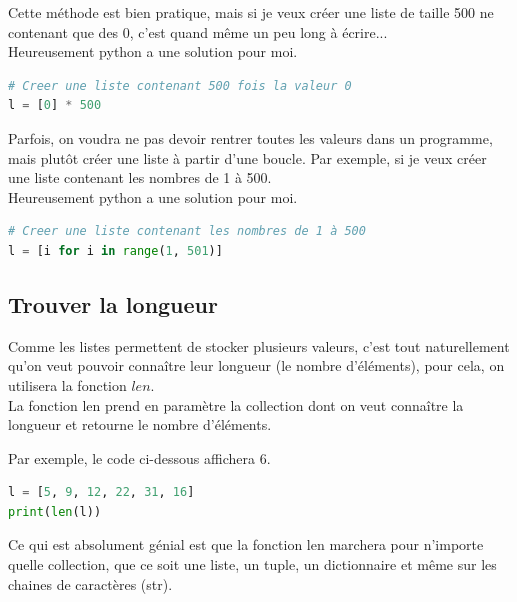 \begin{Astuce}
    Cette méthode est bien pratique, mais si je veux créer une liste de taille 500 ne contenant que des 0, c'est quand même un peu long à écrire...\\
    Heureusement python a une solution pour moi.
\begin{lstlisting}[style=pythonstyle, language=python]
# Creer une liste contenant 500 fois la valeur 0
l = [0] * 500
\end{lstlisting}
\end{Astuce}

\begin{Astuce}
    Parfois, on voudra ne pas devoir rentrer toutes les valeurs dans un programme, mais plutôt créer une liste à partir d'une boucle. Par exemple, si je veux créer une liste contenant les nombres de 1 à 500.\\
    Heureusement python a une solution pour moi.
\begin{lstlisting}[style=pythonstyle, language=python]
# Creer une liste contenant les nombres de 1 à 500
l = [i for i in range(1, 501)]
\end{lstlisting}
\end{Astuce}

\subsection*{Trouver la longueur}
Comme les listes permettent de stocker plusieurs valeurs, c'est tout naturellement qu'on veut pouvoir connaître leur longueur (le nombre d'éléments), pour cela, on utilisera la fonction $len$.\\
La fonction len prend en paramètre la collection dont on veut connaître la longueur et retourne le nombre d'éléments.

\begin{Comprendre}
Par exemple, le code ci-dessous affichera 6.
\begin{lstlisting}[style=pythonstyle, language=python]
l = [5, 9, 12, 22, 31, 16]
print(len(l))
\end{lstlisting}
\end{Comprendre}

\begin{Astuce}
Ce qui est absolument génial est que la fonction len marchera pour n'importe quelle collection, que ce soit une liste, un tuple, un dictionnaire et même sur les chaines de caractères (str).  
\end{Astuce}


